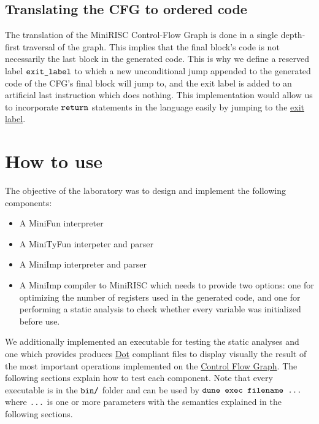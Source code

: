 \documentclass[a4paper,11pt]{report}
\begin{document}
\subsection{Translating the CFG to ordered code}

The translation of the MiniRISC Control-Flow Graph is done in a single depth-first traversal of the graph. This implies that the final block's code is not necessarily the last block in the generated code. This is why we define a reserved label $\verb|exit_label|$ to which a new unconditional jump appended to the generated code of the CFG's final block will jump to, and the exit label is added to an artificial last instruction which does nothing. This implementation would allow us to incorporate $\verb|return|$ statements in the language easily by jumping to the \href{https://github.com/wuacs/unipi-lci/blob/a630eb254e4eadffe7290cbda91d80f921402fde/project/src/lib/target_code.ml#L15}{exit label}.

\section{How to use}

The objective of the laboratory was to design and implement the following components:

\begin{itemize}
	\item A MiniFun interpreter 
	\item A MiniTyFun interpeter and parser
	\item A MiniImp interpreter and parser
	\item A MiniImp compiler to MiniRISC which needs to provide two options: one for optimizing the number of registers used in the generated code, and one for performing a static analysis to check whether every variable was initialized before use. 
\end{itemize}

We additionally implemented an executable for testing the static analyses and one which provides produces \href{https://en.wikipedia.org/wiki/DOT_(graph_description_language)}{Dot} compliant files to display visually the result of the most important operations implemented on the \hyperref[Section::CFG]{Control Flow Graph}.
The following sections explain how to test each component.
Note that every executable is in the $\verb|bin/|$ folder and can be used by $\verb|dune exec filename ...|$ where $\verb|...|$ is one or more parameters with the semantics explained in the following sections.
\end{document}
